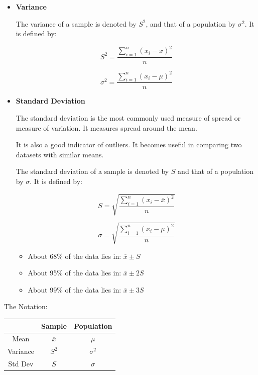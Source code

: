 \documentclass[twocolumn]{article}
\begin{document}
\begin{itemize}
    \item \textbf{Variance}
    
    The variance of a sample is denoted by $S^2$, and that of a population by $\sigma^2$. It is defined by:

    \[
        S^2 = \frac{\displaystyle \sum_{i=1}^{n} (x_i - \overline{x})^2}{n} 
    \]

    \[
        \sigma^2 = \frac{\displaystyle \sum_{i=1}^{n} (x_i - \mu)^2}{n} 
    \]

    \item \textbf{Standard Deviation}
    
    The standard deviation is the most commonly used measure of spread or measure of variation. It measures spread around the mean. 

    It is also a good indicator of outliers. It becomes useful in comparing two datasets with similar means. 

    The standard deviation of a sample is denoted by $S$ and that of a population by $\sigma$. It is defined by:

    \[
        S = \sqrt{\displaystyle \frac{\sum_{i=1}^{n} (x_i - \overline{x})^2}{n}} 
    \]

    \[
        \sigma = \sqrt{\displaystyle \frac{\sum_{i=1}^{n} (x_i - \mu)^2}{n}} 
    \]

    \begin{itemize}
        \item About 68\% of the data lies in: $\overline{x} \pm S$
        \item About 95\% of the data lies in: $\overline{x} \pm 2S$
        \item About 99\% of the data lies in: $\overline{x} \pm 3S$
    \end{itemize}
\end{itemize}

The Notation:

\begin{center}
\begin{tabular}{|c|c|c|}
\hline
& Sample & Population \\ \hline
Mean & $\overline{x}$ & $\mu$ \\ \hline
Variance & $S^2$ & $\sigma^2$ \\ \hline
Std Dev & $S$ & $\sigma$ \\ \hline
\end{tabular}   
\end{center}
\end{document}
